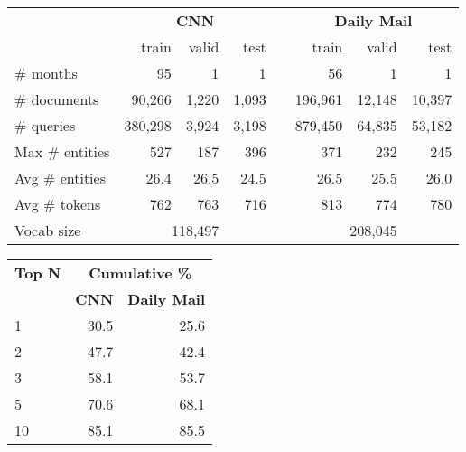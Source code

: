 \documentclass{article}
\begin{document}
\begin{table}[t]
\footnotesize
{\centering
  \begin{minipage}[t]{0.65\textwidth}
  \centering
  \begin{tabular}[t]{@{}l@{~}r@{~~}r@{~~}r@{}l@{}r@{~~}r@{~~}r@{}}
    \toprule
    & \multicolumn{3}{c}{{\bf CNN}} &\phantom{aa}& \multicolumn{3}{c}{{\bf
Daily Mail}} \\
    \cmidrule{2-4} \cmidrule{6-8}
    & train & valid & test && train & valid & test \\
    \midrule
    \# months    & 95       & 1     & 1     &&      56 & 1      & 1 \\
    \# documents &  90,266  & 1,220 & 1,093 && 196,961 & 12,148 & 10,397 \\
    \# queries   & 380,298  & 3,924 & 3,198 && 879,450 & 64,835 & 53,182 \\
    Max \# entities & 527   & 187   & 396   && 371     & 232    & 245 \\
    Avg \# entities & 26.4  & 26.5  & 24.5  && 26.5    & 25.5   & 26.0 \\
    Avg \# tokens  & 762    & 763   & 716   && 813     & 774    & 780  \\
    Vocab size & \multicolumn{3}{c}{{118,497}} && \multicolumn{3}{c}{{208,045}} \\
    \bottomrule
  \end{tabular}
  \label{tab:corpora}
\end{minipage}
\hfill
\begin{minipage}[t]{0.33\textwidth}
\footnotesize
  \centering
  \begin{tabular}[t]{@{}l@{~~}r@{~~}r@{}}
    \toprule
    \textbf{Top N} & \multicolumn{2}{c}{{\bf Cumulative \%}} \\
    \cmidrule{2-3}
    & \textbf{CNN} & \textbf{Daily Mail} \\
    \midrule
    1  & 30.5 & 25.6 \\
    2  & 47.7 & 42.4 \\
    3  & 58.1 & 53.7 \\
    5  & 70.6 & 68.1 \\
    10 & 85.1 & 85.5 \\
    \bottomrule
  \end{tabular}
  \label{tab:cloze_hardness}
\end{minipage}
}
\end{table}
\end{document}
